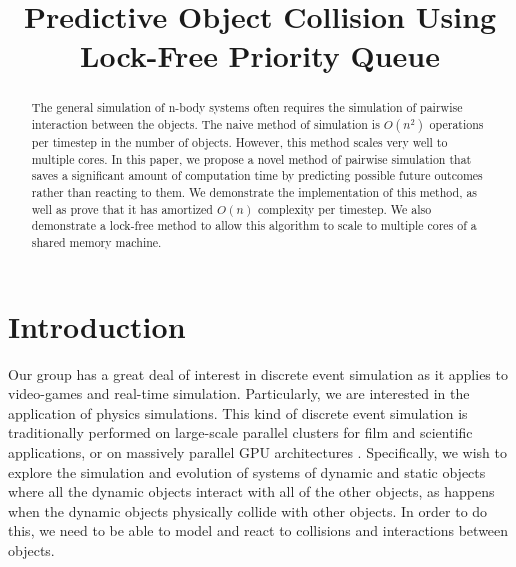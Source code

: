 \documentclass[conference]{IEEEtran}
\begin{document}
%
\title{Predictive Object Collision Using Lock-Free Priority Queue}


\author{
\and{}
}

\maketitle


\begin{abstract} %
The general simulation of n-body systems often requires the simulation of pairwise interaction between the objects.  The naive method of simulation is $O(n^2)$ operations per timestep in the number of objects.  However, this method scales very well to multiple cores. In this paper, we propose a novel method of pairwise simulation that saves a significant amount of computation time by predicting possible future outcomes rather than reacting to them.  We demonstrate the implementation of this method, as well as prove that it has amortized $O(n)$ complexity per timestep.  We also demonstrate a lock-free method to allow this algorithm to scale to multiple cores of a shared memory machine.
\end{abstract}

\IEEEpeerreviewmaketitle


\section{Introduction}

Our group has a great deal of interest in discrete event simulation as it applies to video-games and real-time simulation. Particularly, we are interested in the application of physics simulations.  This kind of discrete event simulation is traditionally performed on large-scale parallel clusters for film and scientific applications, or on massively parallel GPU architectures \cite{grape,uberflow}.  Specifically, we wish to explore the simulation and evolution of systems of dynamic and static objects where all the dynamic objects interact with all of the other objects, as happens when the dynamic objects physically collide with other objects.  In order to do this, we need to be able to model and react to collisions and interactions between objects. 
\end{document}
